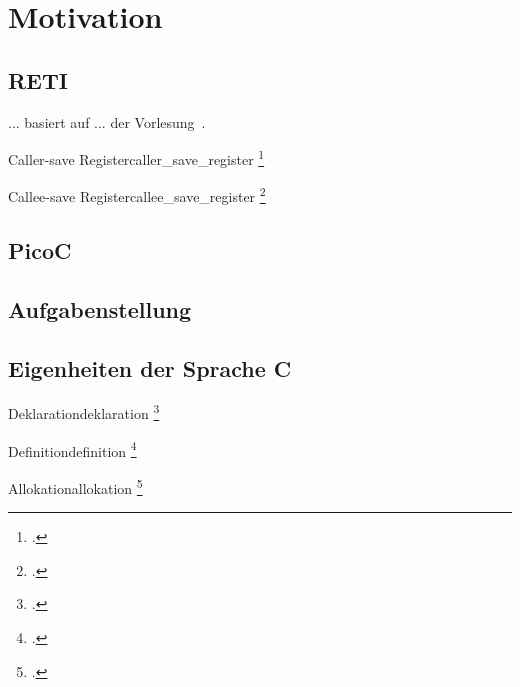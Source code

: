 
\chapter{Motivation}
\label{ch:motivation}

\section{RETI}
... basiert auf ... der Vorlesung~\cite{scholl_betriebssysteme_2020}.

\begin{Definition}{Caller-save Register}{caller_save_register}
  \footcite{g_siek_course_2022}
\end{Definition}

\begin{Definition}{Callee-save Register}{callee_save_register}
  \footcite{g_siek_course_2022}
\end{Definition}

\section{PicoC}
\section{Aufgabenstellung}
\section{Eigenheiten der Sprache C}

\begin{Definition}{Deklaration}{deklaration}
  \footcite{scholl_einfuhrung_2021}
\end{Definition}

\begin{Definition}{Definition}{definition}
  \footcite{scholl_einfuhrung_2021}
\end{Definition}

\begin{Definition}{Allokation}{allokation}
  \footcite{thiemann_einfuhrung_2018}
\end{Definition}

